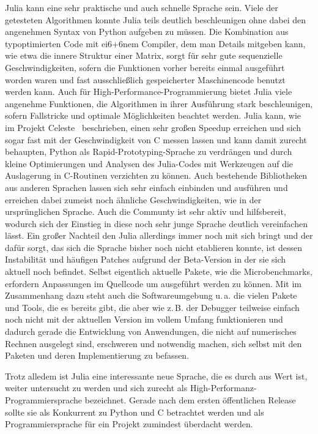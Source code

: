 \documentclass[proseminar,german,utf8]{zihpub}
\newcommand{\zB}[0]{{z.\,B. }}
\newcommand{\ua}[0]{{u.\,a. }}
\begin{document}
Julia kann eine sehr praktische und auch schnelle Sprache sein. Viele der getesteten Algorithmen konnte Julia teils deutlich beschleunigen ohne dabei den angenehmen Syntax von Python aufgeben zu müssen. Die Kombination aus typoptimierten Code mit ei6+6nem Compiler, dem man Details mitgeben kann, wie etwa die innere Struktur einer Matrix, sorgt für sehr gute sequenzielle Geschwindigkeiten, sofern die Funktionen vorher bereits einmal ausgeführt worden waren und fast ausschließlich gespeicherter Maschinencode benutzt werden kann. Auch für High-Performance-Programmierung bietet Julia viele angenehme Funktionen, die Algorithmen in ihrer Ausführung stark beschleunigen, sofern Fallstricke und optimale Möglichkeiten beachtet werden. Julia kann, wie im Projekt Celeste~\cite{CelesteNextPlatform} beschrieben, einen sehr großen Speedup erreichen und sich sogar fast mit der Geschwindigkeit von C messen lassen und kann damit zurecht behaupten, Python als Rapid-Prototyping-Sprache zu verdrängen und durch kleine Optimierungen und Analysen des Julia-Codes mit Werkzeugen auf die Auslagerung in C-Routinen verzichten zu können. 
Auch bestehende Bibliotheken aus anderen Sprachen lassen sich sehr einfach einbinden und ausführen und erreichen dabei zumeist noch ähnliche Geschwindigkeiten, wie in der ursprünglichen Sprache. Auch die Communty ist sehr aktiv und hilfsbereit, wodurch sich der Einstieg in diese noch sehr junge Sprache deutlich vereinfachen lässt. Ein großer Nachteil den Julia allerdings immer noch mit sich bringt und der dafür sorgt, das sich die Sprache bisher noch nicht etablieren konnte, ist dessen Instabilität und häufigen Patches aufgrund der Beta-Version in der sie sich aktuell noch befindet. Selbst eigentlich aktuelle Pakete, wie die Microbenchmarks, erfordern Anpassungen im Quellcode um ausgeführt werden zu können. Mit im Zusammenhang dazu steht auch die Softwareumgebung \ua die vielen Pakete und Tools, die es bereits gibt, die aber wie \zB der Debugger teilweise einfach noch nicht mit der aktuellen Version im vollem Umfang funktionieren und dadurch gerade die Entwicklung von Anwendungen, die nicht auf numerisches Rechnen ausgelegt sind, erschweren und notwendig machen, sich selbst mit den Paketen und deren Implementierung zu befassen. 

Trotz alledem ist Julia eine interessante neue Sprache, die es durch aus Wert ist, weiter untersucht zu werden und sich zurecht als High-Performanz-Programmiersprache bezeichnet. Gerade nach dem ersten öffentlichen Release sollte sie als Konkurrent zu Python und C betrachtet werden und als Programmiersprache für ein Projekt zumindest überdacht werden.
\end{document}
